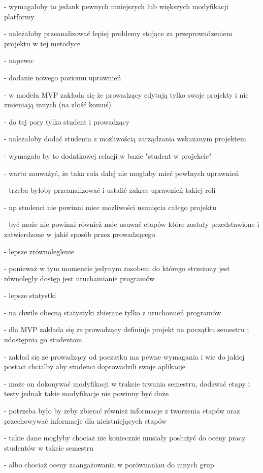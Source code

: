 - wymagałoby to jedank pewnych mniejszych lub większych modyfikacji platformy

- należałoby przeanalizować lepiej problemy stojące za przeprowadzeniem projektu w tej metodyce

- napewo:

    - dodanie nowego poziomu uprawnień

    - w modelu MVP zakłada się że prowadzący edytują tylko swoje projekty i nie zmieniają innych (na złość komuś)

    - do tej pory tylko student i prowadzący

    - należałoby dodać studenta z możliwością zarządzania wskazanym projektem

    - wymagało by to dodatkowej relacji w bazie "student w projekcie"

    - warto zauważyć, że taka rola dalej nie mogłaby mieć pewłnych uprawnień

    - trzeba byłoby przeanalizować i ustalić zakres uprawnień takiej roli

    - np studenci nie powinni miec możliwości usunięcia całego projektu

    - być może nie powinni również móc usuwać etapów które zostały przedstawione i zatwierdzone w jakiś sposób przez prowadzącego

    - lepsze zrównoleglenie

    - ponieważ  w tym momencie jedynym zasobem do którego strzeżony jest równoległy dostęp jest uruchamianie programów

    - lepsze statystki

    - na chwile obecną statystyki zbierane tylko z uruchomień programów

    - dla MVP zakłada się ze prowadzący definiuje projekt na początku semestru i udostępnia go studentom

    - zakład się ze prowadzący od poczatku ma pewne wymagania i wie do jakiej postaci chcialby aby studenci doprowadzili swoje aplikacje

    - może on dokonywać modyfikacji w trakcie trwania semestru, dodawać etapy i testy jednak takie modyfikacje nie powinny być duże

    - potrzeba było by zeby zbierać również informacje z tworzenia etapów oraz przechowywać informacje dla nieistniejących etapów

    - takie dane mogłyby chociaż nie koniecznie musiały posłużyć do oceny pracy studentów w takcie semestru

    - albo chociaż oceny zaangażowania w porównaniau do innych grup

